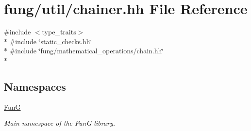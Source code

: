 \hypertarget{chainer_8hh}{\section{fung/util/chainer.hh File Reference}
\label{chainer_8hh}
}
{\ttfamily \#include $<$type\-\_\-traits$>$}\\*
{\ttfamily \#include \char`\"{}static\-\_\-checks.\-hh\char`\"{}}\\*
{\ttfamily \#include \char`\"{}fung/mathematical\-\_\-operations/chain.\-hh\char`\"{}}\\*
\subsection*{Namespaces}
\begin{DoxyCompactItemize}
\item 
\hyperlink{namespaceFunG}{Fun\-G}
\begin{DoxyCompactList}\small\item\em Main namespace of the Fun\-G library. \end{DoxyCompactList}\end{DoxyCompactItemize}
